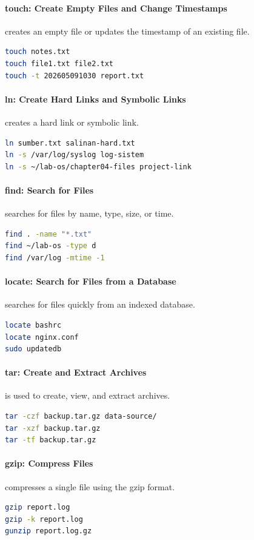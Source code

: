\paragraph*{touch: Create Empty Files and Change Timestamps}
 creates an empty file or updates the timestamp of an existing file.
\begin{lstlisting}[language=bash]
touch notes.txt
touch file1.txt file2.txt
touch -t 202605091030 report.txt
\end{lstlisting}

\paragraph*{ln: Create Hard Links and Symbolic Links}
 creates a hard link or symbolic link.
\begin{lstlisting}[language=bash]
ln sumber.txt salinan-hard.txt
ln -s /var/log/syslog log-sistem
ln -s ~/lab-os/chapter04-files project-link
\end{lstlisting}

\paragraph*{find: Search for Files}
 searches for files by name, type, size, or time.
\begin{lstlisting}[language=bash]
find . -name "*.txt"
find ~/lab-os -type d
find /var/log -mtime -1
\end{lstlisting}

\paragraph*{locate: Search for Files from a Database}
 searches for files quickly from an indexed database.
\begin{lstlisting}[language=bash]
locate bashrc
locate nginx.conf
sudo updatedb
\end{lstlisting}

\paragraph*{tar: Create and Extract Archives}
 is used to create, view, and extract archives.
\begin{lstlisting}[language=bash]
tar -czf backup.tar.gz data-source/
tar -xzf backup.tar.gz
tar -tf backup.tar.gz
\end{lstlisting}

\paragraph*{gzip: Compress Files}
 compresses a single file using the gzip format.
\begin{lstlisting}[language=bash]
gzip report.log
gzip -k report.log
gunzip report.log.gz
\end{lstlisting}

